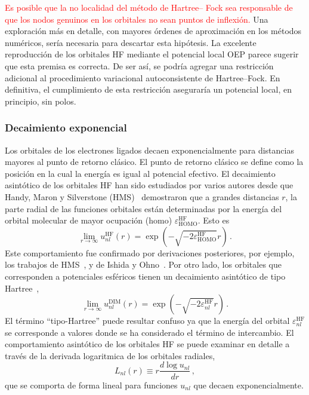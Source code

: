 \textcolor{red}{Es posible que la no localidad del método de Hartree--
Fock sea responsable de que los nodos genuinos en los orbitales no sean 
puntos de inflexión.} Una exploración más en detalle, con mayores 
órdenes de aproximación en los métodos numéricos, sería necesaria para 
descartar esta hipótesis. La excelente reproducción de los orbitales HF 
mediante el potencial local OEP parece sugerir que esta premisa es 
correcta. De ser así, se podría agregar una restricción adicional al 
procedimiento variacional autoconsistente de Hartree--Fock. En 
definitiva, el cumplimiento de esta restricción aseguraría un potencial 
local, en principio, sin polos.

\subsubsection{Decaimiento exponencial}

Los orbitales de los electrones ligados decaen exponencialmente para 
distancias mayores al punto de retorno clásico. El punto de retorno 
clásico se define como la posición en la cual la energía es igual al 
potencial efectivo. El decaimiento asintótico de los orbitales HF han 
sido estudiados por varios autores desde que Handy, Maron y Silverstone 
(HMS)~\cite{Handy:69} demostraron que a grandes distancias $r$, la parte 
radial de las funciones orbitales están determinadas por la energía del 
orbital molecular de mayor ocupación (\acs{homo}) 
$\varepsilon_{\mathrm{HOMO}}^{\mathrm{HF}}$. Esto es 
\begin{equation}
\lim_{r \rightarrow \infty} u_{nl}^{\mathrm{HF}}(r) =  
\exp(- \sqrt{- 2 \varepsilon_{\mathrm{HOMO}}^{\mathrm{HF}} } r )  \, .
\label{eq:rHF}
\end{equation}
Este comportamiento fue confirmado por derivaciones posteriores, por 
ejemplo, los trabajos de HMS~\cite{Handler:80}, y de Ishida y 
Ohno~\cite{Ishida:92}. Por otro lado, los orbitales que corresponden a 
potenciales esféricos tienen un decaimiento asintótico de tipo 
Hartree~\cite{Casida:89},
\begin{equation}
\lim_{r \rightarrow \infty} u_{nl}^{\mathrm{DIM}}(r) =  
\exp(- \sqrt{- 2 \varepsilon_{nl}^{\mathrm{HF}} } r ) \,.
\label{eq:rHlike}
\end{equation}
El término ``tipo-Hartree'' puede resultar confuso ya que la energía 
del orbital $\varepsilon_{nl}^{\mathrm{HF}}$ se corresponde a valores 
donde se ha considerado el término de intercambio. El comportamiento 
asintótico de los orbitales HF se puede examinar en detalle a través de 
la derivada logaritmica de los orbitales radiales, 
\begin{equation}
L_{nl}(r) \equiv r \frac{d \log{u_{nl}}}{d r}\,,
\label{eq:Lnl}
\end{equation}
que se comporta de forma lineal para funciones $u_{nl}$ que decaen 
exponencialmente. 

